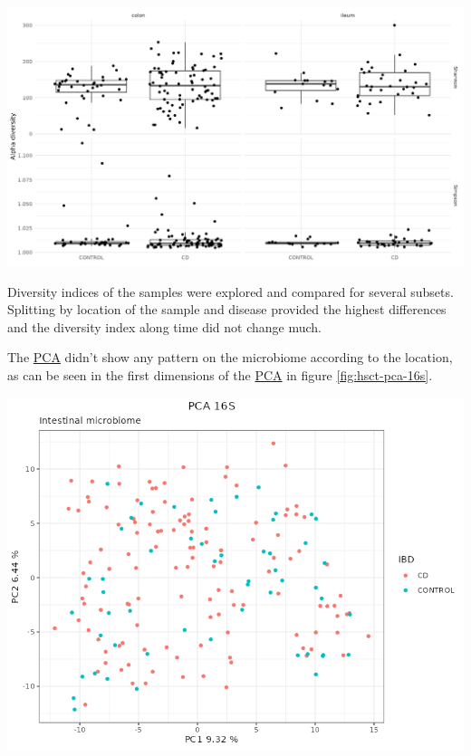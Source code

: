\documentclass[
  12pt,
  a4paper,
  twoside,
  openright]{book}
\let\origfigure\figure
\let\endorigfigure\endfigure
\renewenvironment{figure}[1][2] {
    \expandafter\origfigure\expandafter[!htbp]
} {
    \endorigfigure
}
\begin{document}
\begin{figure}
\includegraphics[width=1\linewidth]{images/hsct-ASV-diversity} \caption[Microbiome diversity in the HSCT dataset.]{Microbiome diversity in the HSCT dataset. On the upper section the Shannon effective and on the lower row the Simpson effective diversity splitted by colon and ileum and controls and CD. There is high diversity between the samples on the same condition.}\label{fig:hsct-diversity}
\end{figure}

Diversity indices of the samples were explored and compared for several subsets.
Splitting by location of the sample and disease provided the highest differences and the diversity index along time did not change much.

The \protect\hyperlink{acronyms_PCA}{PCA} didn't show any pattern on the microbiome according to the location, as can be seen in the first dimensions of the \protect\hyperlink{acronyms_PCA}{PCA} in figure \ref{fig:hsct-pca-16s}.

\begin{figure}
\includegraphics[width=1\linewidth]{images/HSCT_PCA_16S} \caption[PCA of 16S data of the HSCT dataset.]{PCA of the 16S data of the HSCT dataset. There are no clear patterns according to the location. Each point represents a sample (colored and shaped by location).}\label{fig:hsct-pca-16s}
\end{figure}
\end{document}
